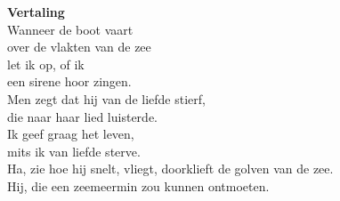 \textbf{Vertaling}\\
Wanneer de boot vaart\\
over de vlakten van de zee\\
let ik op, of ik\\
een sirene hoor zingen.\\
Men zegt dat hij van de liefde stierf,\\
die naar haar lied luisterde.\\
Ik geef graag het leven,\\
mits ik van liefde sterve.\\
Ha, zie hoe hij snelt, vliegt, doorklieft de golven van de zee.\\
Hij, die een zeemeermin zou kunnen ontmoeten.\\
